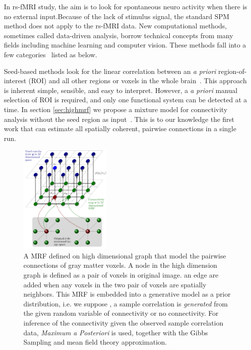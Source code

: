 \documentclass[12pt]{article}
\begin{document}
In rs-fMRI study, the aim is to look for spontaneous neuro activity when there
is no external input.Because of the lack of stimulus signal, the standard SPM
method does not apply to the rs-fMRI data. New computational methods, sometimes
called data-driven analysis, borrow technical concepts from many fields
including machine learning and computer vision. These methods fall into a few
categories~\cite{margulies2010resting} listed as below.

Seed-based methods look for the linear correlation between an \emph{a priori}
region-of-interest (ROI) and all other regions or voxels in the whole
brain~\cite{fox2005human}. This approach is inherent simple, sensible, and easy
to interpret. However, a \emph{a priori} manual selection of ROI is required,
and only one functional system can be detected at a time. In section
\ref{sec:highmrf} we propose a mixture model for connectivity analysis without
the seed region as input~\cite{liu2010spatialCopy}. This is to our knowledge the first
work that can estimate all spatially coherent, pairwise connections in a single
run.

\begin{figure}
  \includegraphics[width=0.4\textwidth]{figures/6dmrf}
  \caption{A MRF defined on high dimensional graph that model the pairwise
  connections of gray matter voxels. A node in the high dimension graph is
  defined as a pair of voxels in original image. an edge are added when any
  voxels in the two pair of voxels are spatially neighbors. This MRF is embedded
  into a generative model as a prior distribution, i.e. we suppose , a sample
  correlation is \emph{generated} from the given random variable of connectivity
  or no connectivity. For inference of the connectivity given the observed
  sample correlation data, \emph{Maximum a Posteriori} is used, together with
  the Gibbs Sampling and mean field theory approximation. }
  \label{fig:6dmrf}
\end{figure}
\end{document}
